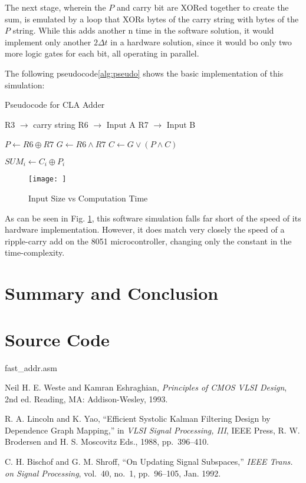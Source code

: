 \documentclass[journal]{IEEEtran}
\begin{document}
The next stage, wherein the $P$ and carry bit are XORed together to create the
sum, is emulated by a loop that XORs bytes of the carry string with bytes of
the $P$ string. While this adds another n time in the software solution, it
would implement only another $2\Delta t$ in a hardware solution, since it would
bo only two more logic gates for each bit, all operating in parallel.

The following pseudocode\ref{alg:pseudo}
shows the basic implementation of this simulation:
\begin{algorithm}[H]
\label{alg:pseudo}
\caption{Pseudocode for CLA Adder}
\begin{algorithmic}
\State R3 $\rightarrow$ carry string
\State R6 $\rightarrow$ Input A
\State R7 $\rightarrow$ Input B

	\State $P \gets R6 \oplus R7$
	\State $G \gets R6 \land R7$
\EndFor
{}
	\State $C \gets G \lor (P \land C)$
\EndFor

	\State $SUM_i \gets C_i \oplus P_i$
\EndFor
\end{algorithmic}
\end{algorithm}

\begin{figure}
	\texttt{[image: ]}
	\caption{Input Size vs Computation Time}
	\label{fig:time}
\end{figure}

As can be seen in Fig. \ref{fig:time}, this software simulation falls far
short of the speed of its hardware implementation. However, it does match very
closely the speed of a ripple-carry add on the 8051 microcontroller, changing
only the constant in the time-complexity.

\section{Summary and Conclusion}

\section{Source Code}\label{sec:code}


{fast_addr.asm}

\begin{thebibliography}{99}

   Neil H. E. Weste and Kamran Eshraghian, {\it Principles
  of CMOS VLSI Design}, 2nd ed. Reading, MA: Addison-Wesley, 1993.

   R. A. Lincoln and K. Yao, ``Efficient Systolic Kalman
  Filtering Design by Dependence Graph Mapping,'' in {\it VLSI Signal
  Processing, III}, IEEE Press, R. W. Brodersen and H. S. Moscovitz Eds.,
  1988, pp.~396--410.

   C. H. Bischof and G. M. Shroff, ``On Updating Signal
  Subspaces,'' {\it IEEE Trans. on Signal Processing}, vol.~40, no.~1,
  pp.~96--105, Jan. 1992.

\end{thebibliography}
\end{document}
